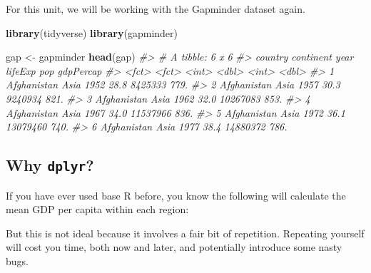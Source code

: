 \documentclass[]{book}
\newenvironment{Shaded}{\begin{snugshade}}{\end{snugshade}}
\newcommand{\KeywordTok}[1]{\textcolor[rgb]{0.13,0.29,0.53}{\textbf{#1}}}
\newcommand{\StringTok}[1]{\textcolor[rgb]{0.31,0.60,0.02}{#1}}
\newcommand{\CommentTok}[1]{\textcolor[rgb]{0.56,0.35,0.01}{\textit{#1}}}
\newcommand{\OperatorTok}[1]{\textcolor[rgb]{0.81,0.36,0.00}{\textbf{#1}}}
\newcommand{\NormalTok}[1]{#1}
\begin{document}
For this unit, we will be working with the Gapminder dataset again.

\begin{Shaded}
\begin{Highlighting}[]
\KeywordTok{library}\NormalTok{(tidyverse)}
\KeywordTok{library}\NormalTok{(gapminder)}

\NormalTok{gap <-}\StringTok{ }\NormalTok{gapminder}
\KeywordTok{head}\NormalTok{(gap)}
\CommentTok{#> # A tibble: 6 x 6}
\CommentTok{#>   country     continent  year lifeExp      pop gdpPercap}
\CommentTok{#>   <fct>       <fct>     <int>   <dbl>    <int>     <dbl>}
\CommentTok{#> 1 Afghanistan Asia       1952    28.8  8425333      779.}
\CommentTok{#> 2 Afghanistan Asia       1957    30.3  9240934      821.}
\CommentTok{#> 3 Afghanistan Asia       1962    32.0 10267083      853.}
\CommentTok{#> 4 Afghanistan Asia       1967    34.0 11537966      836.}
\CommentTok{#> 5 Afghanistan Asia       1972    36.1 13079460      740.}
\CommentTok{#> 6 Afghanistan Asia       1977    38.4 14880372      786.}
\end{Highlighting}
\end{Shaded}

\subsection{\texorpdfstring{Why
\texttt{dplyr}?}{Why dplyr?}}\label{why-dplyr}

If you have ever used base R before, you know the following will
calculate the mean GDP per capita within each region:

\begin{Shaded}
\end{Shaded}

But this is not ideal because it involves a fair bit of repetition.
Repeating yourself will cost you time, both now and later, and
potentially introduce some nasty bugs.
\end{document}
